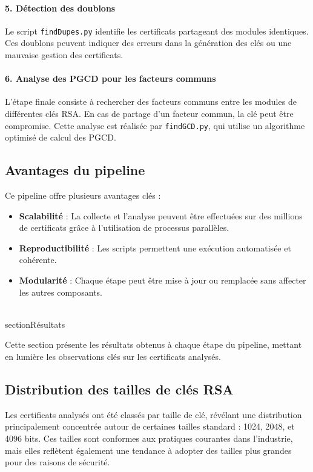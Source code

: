 \documentclass[11pt,a4paper]{article}
\begin{document}
\paragraph{5. Détection des doublons}
Le script \texttt{findDupes.py} identifie les certificats partageant des modules identiques. Ces doublons peuvent indiquer des erreurs dans la génération des clés ou une mauvaise gestion des certificats.

\paragraph{6. Analyse des PGCD pour les facteurs communs}
L'étape finale consiste à rechercher des facteurs communs entre les modules de différentes clés RSA. En cas de partage d'un facteur commun, la clé peut être compromise. Cette analyse est réalisée par \texttt{findGCD.py}, qui utilise un algorithme optimisé de calcul des PGCD.

\subsection{Avantages du pipeline}
Ce pipeline offre plusieurs avantages clés :
\begin{itemize}
    \item \textbf{Scalabilité} : La collecte et l'analyse peuvent être effectuées sur des millions de certificats grâce à l'utilisation de processus parallèles.
    \item \textbf{Reproductibilité} : Les scripts permettent une exécution automatisée et cohérente.
    \item \textbf{Modularité} : Chaque étape peut être mise à jour ou remplacée sans affecter les autres composants.
\end{itemize}

\\section{Résultats}

Cette section présente les résultats obtenus à chaque étape du pipeline, mettant en lumière les observations clés sur les certificats analysés.

\subsection{Distribution des tailles de clés RSA}
Les certificats analysés ont été classés par taille de clé, révélant une distribution principalement concentrée autour de certaines tailles standard : 1024, 2048, et 4096 bits. Ces tailles sont conformes aux pratiques courantes dans l'industrie, mais elles reflètent également une tendance à adopter des tailles plus grandes pour des raisons de sécurité.
\end{document}
